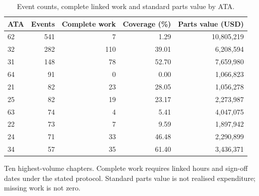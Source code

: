 \begin{table}[htbp]
\centering
\small
\caption{Event counts, complete linked work and standard parts value by ATA.}
\label{tab:event-coverage}
\begin{tabular}{lrrrr}
\toprule
ATA & Events & Complete work & Coverage (\%) & Parts value (USD) \\
\midrule
62 & 541 & 7 & 1.29 & 10,805,219 \\
32 & 282 & 110 & 39.01 & 6,208,594 \\
31 & 148 & 78 & 52.70 & 7,659,980 \\
64 & 91 & 0 & 0.00 & 1,066,823 \\
21 & 82 & 23 & 28.05 & 1,056,278 \\
25 & 82 & 19 & 23.17 & 2,273,987 \\
63 & 74 & 4 & 5.41 & 4,047,075 \\
22 & 73 & 7 & 9.59 & 1,897,942 \\
24 & 71 & 33 & 46.48 & 2,290,899 \\
34 & 57 & 35 & 61.40 & 3,436,371 \\
\bottomrule
\end{tabular}
\par\smallskip
{\footnotesize Ten highest-volume chapters. Complete work requires linked hours and sign-off dates under the stated protocol. Standard parts value is not realised expenditure; missing work is not zero.}
\end{table}
